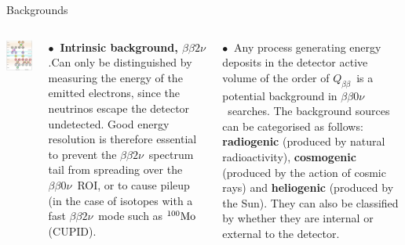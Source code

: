 \documentclass [aspectratio=169]{beamer}
\newcommand{\bbonu}{\ensuremath{\beta\beta0\nu}}
\newcommand{\bbtnu}{\ensuremath{\beta\beta2\nu}}
\newcommand{\qbb}{\ensuremath{Q_{\beta\beta}}}
\newcommand{\MO}{\ensuremath{{}^{100}{\rm Mo}}}
\begin{document}
\begin{frame}{Backgrounds}
\begin{columns}
\includegraphics[scale=0.43]{radiochains.png}

$\bullet~$ {\bf Intrinsic background, \bbtnu}.Can only be distinguished by measuring the energy of the emitted electrons, since the neutrinos escape the detector undetected. Good energy resolution is therefore essential to prevent the \bbtnu\ spectrum tail from spreading over the \bbonu\ ROI, or to cause pileup (in the case of isotopes with a fast \bbtnu\ mode such as \MO (CUPID).

$\bullet~$ Any process generating energy deposits in the detector active volume of the order of \qbb\ is a potential background in \bbonu\ searches. The background sources can be categorised as follows: {\bf radiogenic} (produced by natural radioactivity), {\bf cosmogenic} (produced by the action of cosmic rays) and {\bf heliogenic} (produced by the Sun). They can also be classified by whether they are internal or external to the detector.

\end{columns}
\end{frame}
\end{document}
